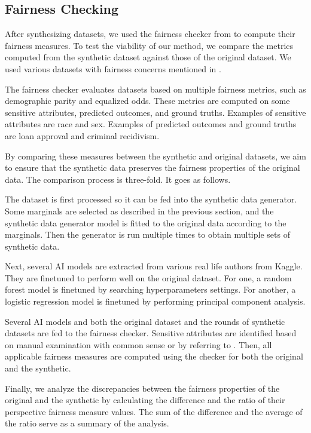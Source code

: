 \documentclass[acmsmall,sigconf]{acmart}
\begin{document}
\subsection{Fairness Checking}

After synthesizing datasets, we used the fairness checker from \cite{yuan2024ensuring} to compute their fairness measures. To test the viability of our method, we compare the metrics computed from the synthetic dataset against those of the original dataset. We used various datasets with fairness concerns mentioned in \cite{pessach2022review}.

The fairness checker evaluates datasets based on multiple fairness metrics, such as demographic parity and equalized odds. These metrics are computed on some sensitive attributes, predicted outcomes, and ground truths. Examples of sensitive attributes are race and sex. Examples of predicted outcomes and ground truths are loan approval and criminal recidivism.

By comparing these measures between the synthetic and original datasets, we aim to ensure that the synthetic data preserves the fairness properties of the original data. The comparison process is three-fold. It goes as follows.

The dataset is first processed so it can be fed into the synthetic data generator. Some marginals are selected as described in the previous section, and the synthetic data generator model is fitted to the original data according to the marginals. Then the generator is run multiple times to obtain multiple sets of synthetic data.

Next, several AI models are extracted from various real life authors from Kaggle. They are finetuned to perform well on the original dataset. For one, a random forest model is finetuned by searching hyperparameters settings\cite{Ipbyrne2023}. For another, a logistic regression model is finetuned by performing principal component analysis\cite{Prashant1112023}.

Several AI models and both the original dataset and the rounds of synthetic datasets are fed to the fairness checker. Sensitive attributes are identified based on manual examination with common sense or by referring to \cite{pessach2022review}. Then, all applicable fairness measures are computed using the checker for both the original and the synthetic.

Finally, we analyze the discrepancies between the fairness properties of the original and the synthetic by calculating the difference and the ratio of their perspective fairness measure values. The sum of the difference and the average of the ratio serve as a summary of the analysis.
\end{document}
